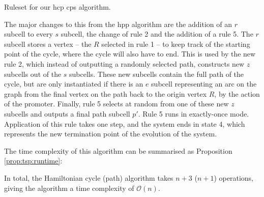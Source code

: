 \cpresetrulenumber

\begin{cprulesetfloat}
    \begin{cpruleset}
        
        
        
        
        
        
    \end{cpruleset}
    \caption[Ruleset for the ]{\label{ruleset:tsp:hcp}Ruleset for our \gls{hcp} \gls{cps} algorithm.}
\end{cprulesetfloat}

The major changes to this from the \gls{hpp} algorithm are the addition of an \(r\) subcell to every \(s\) subcell, the change of rule 2 and the addition of a rule 5. The \(r\) subcell stores a vertex -- the \(R\) selected in rule 1 -- to keep track of the starting point of the cycle, where the cycle will also have to end.  This is used by the new rule 2, which instead of outputting a randomly selected path, constructs new \(z\) subcells out of the \(s\) subcells.  These new subcells contain the full path of the cycle, but are only instantiated if there is an \(e\) subcell representing an arc on the graph from the final vertex on the path back to the origin vertex \(R\), by the action of the promoter.  Finally, rule 5 selects at random from one of these new \(z\) subcells and outputs a final path subcell \(p'\).  Rule 5 runs in exactly-once mode.  Application of this rule takes one step, and the system ends in state 4, which represents the new termination point of the evolution of the system.

The time complexity of this algorithm can be summarised as Proposition \ref{prop:tsp:runtime}:

\begin{proposition}
In total, the Hamiltonian cycle (path) algorithm takes \(n + 3\) (\(n + 1\)) operations, giving the algorithm a time complexity of \(\mathcal{O}(n)\).
\label{prop:tsp:runtime}
\end{proposition}